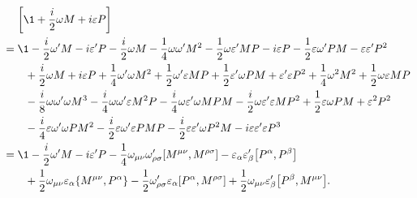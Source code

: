 \begin{mdframed}
\begin{innerproof}
\begin{align*}
        &\quad\, \left[ \1 + \frac{i}{2} \omega M + i \epsilon P  \right] \\
        &= \1 - \frac{i}{2} \omega' M - i \epsilon' P - \frac{i}{2} \omega M - \frac{1}{4} \omega \omega' M^2 - \frac{1}{2} \omega \epsilon' M P - i \epsilon P - \frac{1}{2} \epsilon \omega' P M - \epsilon \epsilon' P^2 \\
        &\quad\quad +\frac{i}{2}\omega M + i \epsilon P +\frac{1}{4} \omega' \omega M^2 + \frac{1}{2} \omega' \epsilon M P +\frac{1}{2} \epsilon' \omega P M + \epsilon' \epsilon P^2 +\frac{1}{4} \omega^2 M^2 + \frac{1}{2} \omega \epsilon M P \\
        &\quad\quad -\frac{i}{8} \omega \omega' \omega M^3 - \frac{i}{4} \omega \omega' \epsilon M^2 P -\frac{i}{4} \omega \epsilon' \omega M P M - \frac{i}{2} \omega \epsilon' \epsilon M P^2 +\frac{1}{2} \epsilon \omega P M + \epsilon^2 P^2 \\
        &\quad\quad -\frac{i}{4} \epsilon \omega' \omega P M^2 - \frac{i}{2} \epsilon \omega' \epsilon P M P -\frac{i}{2} \epsilon \epsilon' \omega P^2 M - i \epsilon \epsilon' \epsilon P^3 \\
        &= \1 -\frac{i}{2} \omega' M - i \epsilon' P - \frac{1}{4} \omega_{\mu\nu} \omega'_{\rho\sigma} \comm{M^{\mu\nu}}{M^{\rho\sigma}} - \epsilon_\alpha \epsilon'_\beta \comm{P^\alpha}{P^\beta} \\
        &\quad\quad +\frac{1}{2} \omega_{\mu\nu} \epsilon_\alpha \{ M^{\mu\nu}, P^\alpha \} - \frac{1}{2} \omega'_{\rho\sigma} \epsilon_\alpha \comm{P^\alpha}{M^{\rho\sigma}} + \frac{1}{2} \omega_{\mu\nu} \epsilon'_\beta \comm{P^\beta}{M^{\mu\nu}}.
    \end{align*}


\end{innerproof}
\end{mdframed}
